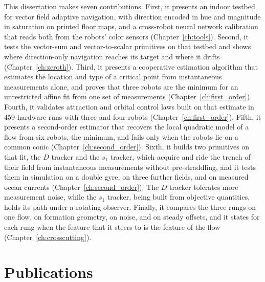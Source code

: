 This dissertation makes seven contributions. First, it presents an indoor
testbed for vector field adaptive navigation, with direction encoded in
hue and magnitude in saturation on printed floor maps, and a cross-robot
neural network calibration that reads both from the robots' color sensors
(Chapter~\ref{ch:tools}). Second, it tests the vector-sum and
vector-to-scalar primitives on that testbed and shows where
direction-only navigation reaches its target and where it drifts
(Chapter~\ref{ch:zeroth}). Third, it presents a cooperative estimation algorithm that
estimates the location and type of a critical point from instantaneous
measurements alone, and proves that three robots are the minimum for an
unrestricted affine fit from one set of measurements
(Chapter~\ref{ch:first_order}). Fourth, it validates attraction
and orbital control laws built on that estimate in 459 hardware runs
with three and four robots (Chapter~\ref{ch:first_order}). Fifth, it presents a
second-order estimator that recovers the local quadratic model of a flow
from six robots, the minimum, and fails only when the robots lie on a
common conic (Chapter~\ref{ch:second_order}). Sixth, it builds two
primitives on that fit, the $D$ tracker and the $s_1$ tracker, which
acquire and ride the trench of their field from instantaneous measurements
without pre-straddling, and it tests them in simulation on a double gyre,
on three further fields, and on measured ocean currents
(Chapter~\ref{ch:second_order}). The $D$ tracker tolerates more
measurement noise, while the $s_1$ tracker, being built from objective
quantities, holds its path under a rotating observer. Finally, it compares
the three rungs on one flow, on formation geometry, on noise, and on steady
offsets, and it states for each rung when the feature that it steers to is
the feature of the flow (Chapter~\ref{ch:crosscutting}).

\section{Publications}
\label{sec:ch1:publications}

